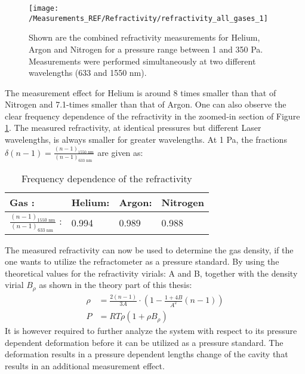 \begin{figure}[H]
	\centering
	\texttt{[image: /Measurements\_REF/Refractivity/refractivity\_all\_gases\_1]}
	\caption{Shown are the combined refractivity measurements for Helium, Argon and Nitrogen for a pressure range between 1 and 350 Pa. Measurements were performed simultaneously at two different wavelengths (633 and 1550 nm).}
	\label{fig:refractivity_all_gases}
\end{figure}
\noindent
The measurement effect for Helium is around 8 times smaller than that of Nitrogen and 7.1-times smaller than that of Argon. One can also observe the clear frequency dependence of the refractivity in the zoomed-in section of Figure \ref{fig:refractivity_all_gases}. The measured refractivity, at identical pressures but different Laser wavelengths, is always smaller for greater wavelengths. At 1 Pa, the fractions $\delta(n-1)=\frac{(n-1)_{1550 \text{ nm}}}{(n-1)_{633\text{ nm }}}$ are given as:
\begin{table}[H]
	\begin{center}
		\begin{tabular}{ llll }
			
			Gas : & Helium: & Argon: & Nitrogen\\
			\toprule
			$\frac{(n-1)_{1550 \text{ nm}}}{(n-1)_{633\text{ nm }}}$ : & 0.994   & 0.989 & 0.988\\
			\bottomrule
		\end{tabular}
	\end{center}
	\caption{Frequency dependence of the refractivity}
	\label{table:Frequency dependence of the refractivity}
\end{table}
\noindent
The measured refractivity can now be used to determine the gas density, if the one wants to utilize the refractometer as a pressure standard. By using the theoretical values for the refractivity virials: A and B, together with the density virial $B_{\rho}$ as shown in the theory part of this thesis:
\begin{align}
	\rho &= \frac{2(n-1)}{3A}\cdot \left(1-\frac{1+4B}{A^2}(n-1)\right)\\
	P&=RT\rho \left(1+\rho B_{\rho}\right)
\end{align}
It is however required to further analyze the system with respect to its pressure dependent deformation before it can be utilized as a pressure standard. The deformation results in a pressure dependent lengths change of the cavity that results in an additional measurement effect.

